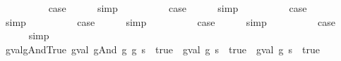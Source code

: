 \begin{isabellebody}
\isamarkupfalse%
\isanewline
\ \ \isamarkupfalse%
\ {\isachardoublequoteopen}{}{\isacharunderscore}{}{\isachardoublequoteclose}\isanewline
\ \ \isamarkupfalse%
\ \isamarkupfalse%
\ {\isacharquery}case\isanewline
\ \ \ \ \isamarkupfalse%
\ simp\isanewline
{}\isamarkupfalse%
\isanewline
\ \ \isamarkupfalse%
\ {\isachardoublequoteopen}{}{\isacharunderscore}{}{\isachardoublequoteclose}\isanewline
\ \ \isamarkupfalse%
\ \isamarkupfalse%
\ {\isacharquery}case\isanewline
\ \ \ \ \isamarkupfalse%
\ simp\isanewline
{}\isamarkupfalse%
\isanewline
\ \ \isamarkupfalse%
\ {}\isanewline
\ \ \isamarkupfalse%
\ \isamarkupfalse%
\ {\isacharquery}case\isanewline
\ \ \ \ \isamarkupfalse%
\ simp\isanewline
{}\isamarkupfalse%
\isanewline
\ \ \isamarkupfalse%
\ {\isachardoublequoteopen}{}{\isacharunderscore}{}{\isachardoublequoteclose}\isanewline
\ \ \isamarkupfalse%
\ \isamarkupfalse%
\ {\isacharquery}case\isanewline
\ \ \ \ \isamarkupfalse%
\ simp\isanewline
{}\isamarkupfalse%
\isanewline
\ \ \isamarkupfalse%
\ {\isachardoublequoteopen}{}{\isacharunderscore}{}{\isachardoublequoteclose}\isanewline
\ \ \isamarkupfalse%
\ \isamarkupfalse%
\ {\isacharquery}case\isanewline
\ \ \ \ \isamarkupfalse%
\ simp\isanewline
{}\isamarkupfalse%
\isanewline
\ \ \isamarkupfalse%
\ {}\isanewline
\ \ \isamarkupfalse%
\ \isamarkupfalse%
\ {\isacharquery}case\isanewline
\ \ \ \ \isamarkupfalse%
\ simp\isanewline
{}\isamarkupfalse%
%
\endisatagproof
{\isafoldproof}%
%
\isadelimproof
\isanewline
%
\endisadelimproof
\isanewline
{}\isamarkupfalse%
\ gval{\isacharunderscore}gAnd{\isacharunderscore}True{\isacharcolon}\ {\isachardoublequoteopen}{\isacharparenleft}gval\ {\isacharparenleft}gAnd\ g{}\ g{}{\isacharparenright}\ s\ {\isacharequal}\ true{\isacharparenright}\ {\isacharequal}\ {\isacharparenleft}{\isacharparenleft}gval\ g{}\ s\ {\isacharequal}\ true{\isacharparenright}\ {\isasymand}\ gval\ g{}\ s\ {\isacharequal}\ true{\isacharparenright}{\isachardoublequoteclose}\isanewline

\end{isabellebody}
